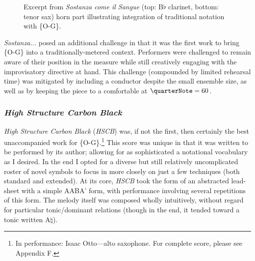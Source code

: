         \begin{figure}
            \centering
            \captionsetup{width=.5\textwidth}
            \caption{Excerpt from \textit{Sostanza come il Sangue} (top: B$\flat$ clarinet, bottom: tenor sax) horn part illustrating integration of traditional notation with \{O-G\}.}
            \label{fig:sostanzahorns}
        \end{figure}

    \textit{Sostanza...} posed an additional challenge in that it was the first work to bring \{O-G\} into a traditionally-metered context. Performers were challenged to remain aware of their position in the measure while still creatively engaging with the improvisatory directive at hand. This challenge (compounded by limited rehearsal time) was mitigated by including a conductor despite the small ensemble size, as well as by keeping the piece to a comfortable  at $\quarterNote=60$.
    
    \subsubsection{\textit{High Structure Carbon Black}} 

    \textit{High Structure Carbon Black} (\textit{HSCB}) was, if not the first, then certainly the best unaccompanied work for \{O-G\}.\footnote{In performance: Isaac Otto---alto saxophone. For complete score, please see Appendix F.} This score was unique in that it was written to be performed by its author; allowing for as sophisticated a notational vocabulary as I desired. In the end I opted for a diverse but still relatively uncomplicated roster of novel symbols to focus in more closely on just a few techniques (both standard and extended). At its core, \textit{HSCB} took the form of an abstracted lead-sheet with a simple AABA' form, with performance involving several repetitions of this form. The melody itself was composed wholly intuitively, without regard for particular tonic/dominant relations (though in the end, it tended toward a tonic written A$\natural$).

